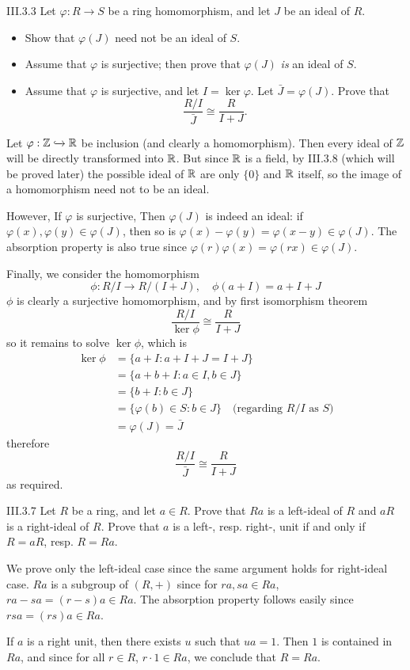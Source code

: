 \begin{problem}{III.3.3}
Let $\varphi : R \to S$ be a ring homomorphism, and let $J$ be an ideal of $R$.
\end{problem}
\begin{itemize}
\setlength\itemsep{0pt}
\item Show that $\varphi(J)$ need not be an ideal of $S$.
\item Assume that $\varphi$ is surjective; then prove that $\varphi(J)$ \emph{is} an ideal of $S$.
\item Assume that $\varphi$ is surjective, and let $I = \ker \varphi$. Let $\bar{J} = \varphi(J)$. Prove that 
\[
\frac{R/I}{\bar{J}} \cong \frac{R}{I+J}.	
\]
\end{itemize}
\begin{pf}
Let $\varphi : \mathbb{Z} \xhookrightarrow{} \mathbb{R}$ be inclusion (and clearly a homomorphism). Then every ideal of $\mathbb{Z}$ will be directly transformed into $\mathbb{R}$. But since $\mathbb{R}$ is a field, by III.3.8 (which will be proved later) the possible ideal of $\mathbb{R}$ are only $\{0\}$ and $\mathbb{R}$ itself, so the image of a homomorphism need not to be an ideal.

However, If $\varphi$ is surjective, Then $\varphi(J)$ is indeed an ideal: if $\varphi(x), \varphi(y) \in \varphi(J)$, then so is $\varphi(x) - \varphi(y) = \varphi(x-y) \in \varphi(J)$. The absorption property is also true since $\varphi(r)\varphi(x) = \varphi(rx) \in \varphi(J)$.

Finally, we consider the homomorphism
\[
\phi : R/I \to R/(I+J), \quad \phi(a + I) = a + I + J
\]
$\phi$ is clearly a surjective homomorphism, and by first isomorphism theorem
\[
\frac{R/I}{\ker \phi} \cong \frac{R}{I+J}	
\]
so it remains to solve $\ker \phi$, which is
\begin{align*}
\ker \phi &= \{a + I : a + I + J = I + J\} \\
&= \{a +b + I : a \in I, b \in J\} \\
&= \{b + I : b \in J\} \\
&= \{\varphi(b) \in S : b \in J\} \quad \text{(regarding } R/I \text{ as } S)\\
&= \varphi(J) = \bar{J}
\end{align*}
therefore
\[
\frac{R/I}{\bar{J}} \cong \frac{R}{I+J}
\]
as required.
\end{pf}

\begin{problem}{III.3.7}
Let $R$ be a ring, and let $a \in R$. Prove that $Ra$ is a left-ideal of $R$ and $aR$ is a right-ideal of $R$. Prove that $a$ is a left-, resp. right-, unit if and only if $R = aR$, resp. $R = Ra$.
\end{problem}
\begin{pf}
We prove only the left-ideal case since the same argument holds for right-ideal case. $Ra$ is a subgroup of $(R,+)$ since for $ra, sa \in Ra$, $ra - sa = (r-s)a \in Ra$. The absorption property follows easily since $rsa = (rs)a \in Ra$.

If $a$ is a right unit, then there exists $u$ such that $ua = 1$. Then $1$ is contained in $Ra$, and since for all $r\in R$, $r \cdot 1 \in Ra$, we conclude that $R = Ra$.   
\end{pf}

